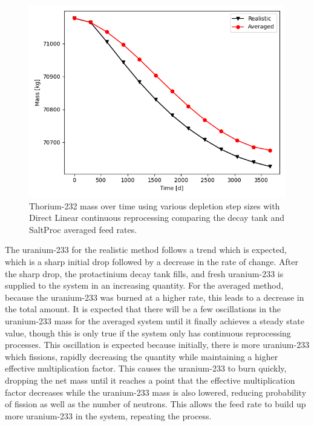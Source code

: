 \begin{figure}[H]
  \centering
  \includegraphics[scale=0.7]{images/adv-Th232.png}
  \caption{Thorium-232 mass over time using various depletion step sizes with Direct Linear continuous reprocessing comparing the decay tank and SaltProc averaged feed rates.}
   \label{fig:DL-cont-th-adv}
\end{figure}

The uranium-233 for the realistic method follows a trend which is expected, which is a sharp initial drop followed by a decrease in the rate of change. After the sharp drop, the protactinium decay tank fills, and fresh uranium-233 is supplied to the system in an increasing quantity. For the averaged method, because the uranium-233 was burned at a higher rate, this leads to a decrease in the total amount. It is expected that there will be a few oscillations in the uranium-233 mass for the averaged system until it finally achieves a steady state value, though this is only true if the system only has continuous reprocessing processes. This oscillation is expected because initially, there is more uranium-233 which fissions, rapidly decreasing the quantity while maintaining a higher effective multiplication factor. This causes the uranium-233 to burn quickly, dropping the net mass until it reaches a point that the effective multiplication factor decreases while the uranium-233 mass is also lowered, reducing probability of fission as well as the number of neutrons. This allows the feed rate to build up more uranium-233 in the system, repeating the process.

